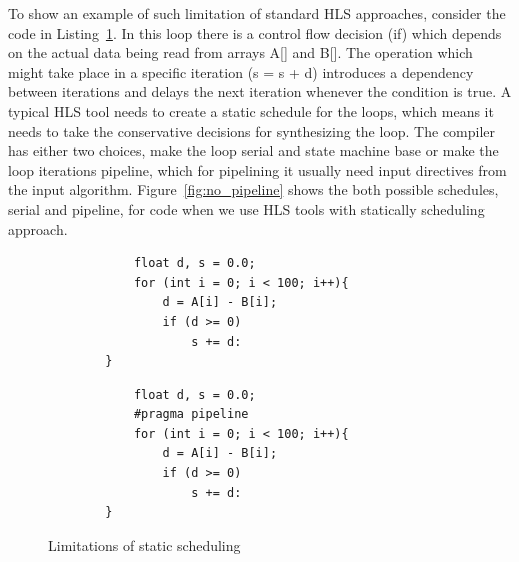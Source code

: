 To show an example of such limitation of standard HLS approaches, consider the code in Listing~\ref{listing:static_schedule}.
In this loop there is a control flow decision (if) which depends on the actual data being read from arrays A[] and B[].
The operation which might take place in a specific iteration (s = s + d) introduces a dependency between iterations and delays the next iteration whenever the condition is true.
A typical HLS tool needs to create a static schedule for the loops, which means it needs to take the conservative decisions for synthesizing the loop. The compiler has either two choices, make the loop serial and state machine base or make the loop iterations pipeline, which for pipelining it usually need input directives from the input algorithm.
Figure~\ref{fig:no_pipeline} shows the both possible schedules, serial and pipeline, for  code when we use HLS tools with statically scheduling approach.


\begin{figure}[ht]
    \begin{minipage}{0.4\linewidth}
        \begin{verbatim}
            float d, s = 0.0;
            for (int i = 0; i < 100; i++){
                d = A[i] - B[i];
                if (d >= 0)
                    s += d:
        }
    \end{verbatim}
    \end{minipage}
    \begin{minipage}{0.45\linewidth}
        \begin{verbatim}
            float d, s = 0.0;
            #pragma pipeline
            for (int i = 0; i < 100; i++){
                d = A[i] - B[i];
                if (d >= 0)
                    s += d:
        }
    \end{verbatim}
    \end{minipage}
    \caption{Limitations of static scheduling}
    \label{listing:static_schedule}
\end{figure}


